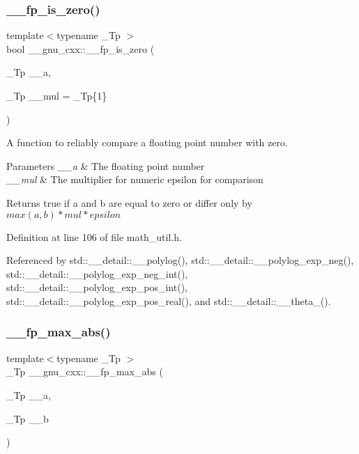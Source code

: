 \subsubsection{\texorpdfstring{\+\_\+\+\_\+fp\+\_\+is\+\_\+zero()}{\_\_fp\_is\_zero()}}
{\footnotesize\ttfamily template$<$typename \+\_\+\+Tp $>$ \\
bool \+\_\+\+\_\+gnu\+\_\+cxx\+::\+\_\+\+\_\+fp\+\_\+is\+\_\+zero (\begin{DoxyParamCaption}\item[{\+\_\+\+Tp}]{\+\_\+\+\_\+a,  }\item[{\+\_\+\+Tp}]{\+\_\+\+\_\+mul = {\ttfamily \+\_\+Tp\{1\}} }\end{DoxyParamCaption})\hspace{0.3cm}{\ttfamily [inline]}}

A function to reliably compare a floating point number with zero.


\begin{DoxyParams}{Parameters}
{\em \+\_\+\+\_\+a} & The floating point number \\
\hline
{\em \+\_\+\+\_\+mul} & The multiplier for numeric epsilon for comparison \\
\hline
\end{DoxyParams}
\begin{DoxyReturn}{Returns}
{\ttfamily true} if a and b are equal to zero or differ only by $ max(a,b) * mul * epsilon $ 
\end{DoxyReturn}


Definition at line 106 of file math\+\_\+util.\+h.



Referenced by std\+::\+\_\+\+\_\+detail\+::\+\_\+\+\_\+polylog(), std\+::\+\_\+\+\_\+detail\+::\+\_\+\+\_\+polylog\+\_\+exp\+\_\+neg(), std\+::\+\_\+\+\_\+detail\+::\+\_\+\+\_\+polylog\+\_\+exp\+\_\+neg\+\_\+int(), std\+::\+\_\+\+\_\+detail\+::\+\_\+\+\_\+polylog\+\_\+exp\+\_\+pos\+\_\+int(), std\+::\+\_\+\+\_\+detail\+::\+\_\+\+\_\+polylog\+\_\+exp\+\_\+pos\+\_\+real(), and std\+::\+\_\+\+\_\+detail\+::\+\_\+\+\_\+theta\+\_().

\mbox{\label{namespace____gnu__cxx_adebbf99919675806def929327e724a53}} 
\subsubsection{\texorpdfstring{\+\_\+\+\_\+fp\+\_\+max\+\_\+abs()}{\_\_fp\_max\_abs()}}
{\footnotesize\ttfamily template$<$typename \+\_\+\+Tp $>$ \\
\+\_\+\+Tp \+\_\+\+\_\+gnu\+\_\+cxx\+::\+\_\+\+\_\+fp\+\_\+max\+\_\+abs (\begin{DoxyParamCaption}\item[{\+\_\+\+Tp}]{\+\_\+\+\_\+a,  }\item[{\+\_\+\+Tp}]{\+\_\+\+\_\+b }\end{DoxyParamCaption})\hspace{0.3cm}{\ttfamily [inline]}}

